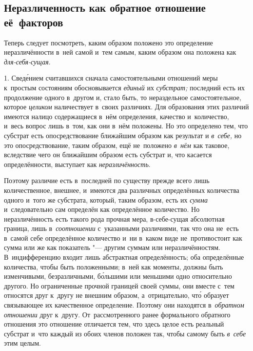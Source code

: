 \subsection[Неразличенность как обратное отношение её факторов]%
{Неразличенность как обратное отношение
её~факторов}

Теперь следует посмотреть, каким образом положено это определение
неразличённости в~ней самой и~тем самым, каким образом она положена
как {\em для-себя-сущая}.

1. Свед\'{е}нием считавшихся сначала самостоятельными отношений меры
к~простым состояниям обосновывается {\em единый} их {\em субстрат;} последний
есть их продолжение одного в~другом и, стало быть, то нераздельное
самостоятельное, которое {\em целиком} наличествует в~своих различиях.
Для образования этих различий имеются налицо содержащиеся в~нём определения,
качество и~количество, и~весь вопрос лишь в~том, как они в~нём положены.
Но это определено тем, что субстрат есть опосредствование ближайшим образом
как результат и {\em в~себе,} но это опосредствование, таким образом, ещё
не~положено {\em в~нём} как таковое, вследствие чего он ближайшим образом есть
субстрат и, что касается определённости, выступает как {\em неразличённость}.

Поэтому различие есть в~последней по существу прежде всего лишь количественное,
внешнее, и~имеются два различных определённых количества одного и~того же
субстрата, который, таким образом, есть их {\em сумма} и~следовательно сам
определён как определённое количество. Но неразличённость есть такого рода
прочная мера, в-себе-сущая абсолютная граница, лишь в~{\em соотношении}
с~указанными различиями, так что она не~есть в~самой себе определённое
количество и~ни в~каком виде не~противостоит как сумма или же как
показатель "--- другим суммам или неразличённостям. В~индифференцию входит
лишь абстрактная определённость; оба определённые количества, чтобы быть
положенными; в~ней как моменты, должны быть изменчивыми, безразличными,
б\'{о}льшими или меньшими одно относительно другого. Но ограниченные прочной
границей своей суммы, они вместе с~тем относятся друг к~другу не внешним
образом, а~отрицательно, чт\'{о} образует связывающее их качественное
определение. Поэтому они находятся в~{\em обратном отношении} друг к~другу.
От~рассмотренного ранее формального обратного отношения это отношение
отличается тем, что здесь целое есть реальный субстрат и~что каждый из обоих
членов положен так, чтобы самому быть {\em в~себе} этим целым.


